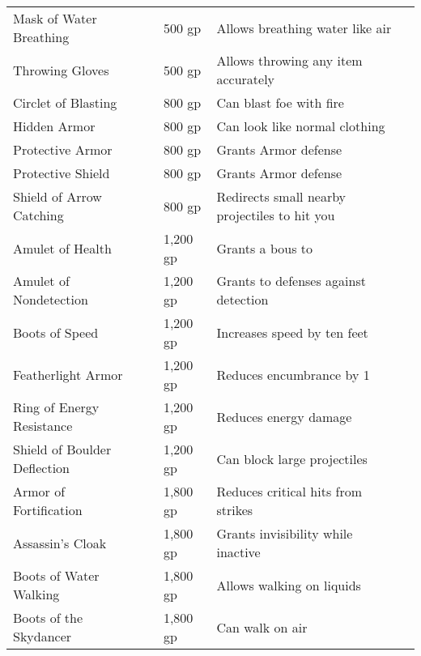 \begin{longtabuwrapper}
\begin{longtabu}{l l l X l}
Mask of Water Breathing &  & 500 gp & Allows breathing water like air & \pageref{item:Mask of Water Breathing} \\
Throwing Gloves &  & 500 gp & Allows throwing any item accurately & \pageref{item:Throwing Gloves} \\
Circlet of Blasting &  & 800 gp & Can blast foe with fire & \pageref{item:Circlet of Blasting} \\
Hidden Armor &  & 800 gp & Can look like normal clothing & \pageref{item:Hidden Armor} \\
Protective Armor &  & 800 gp & Grants  Armor defense & \pageref{item:Protective Armor} \\
Protective Shield &  & 800 gp & Grants  Armor defense & \pageref{item:Protective Shield} \\
Shield of Arrow Catching &  & 800 gp & Redirects small nearby projectiles to hit you & \pageref{item:Shield of Arrow Catching} \\
Amulet of Health &  & 1,200 gp & Grants a  bous to  & \pageref{item:Amulet of Health} \\
Amulet of Nondetection &  & 1,200 gp & Grants  to defenses against detection & \pageref{item:Amulet of Nondetection} \\
Boots of Speed &  & 1,200 gp & Increases speed by ten feet & \pageref{item:Boots of Speed} \\
Featherlight Armor &  & 1,200 gp & Reduces encumbrance by 1 & \pageref{item:Featherlight Armor} \\
Ring of Energy Resistance &  & 1,200 gp & Reduces energy damage & \pageref{item:Ring of Energy Resistance} \\
Shield of Boulder Deflection &  & 1,200 gp & Can block large projectiles & \pageref{item:Shield of Boulder Deflection} \\
Armor of Fortification &  & 1,800 gp & Reduces critical hits from strikes & \pageref{item:Armor of Fortification} \\
Assassin's Cloak &  & 1,800 gp & Grants invisibility while inactive & \pageref{item:Assassin's Cloak} \\
Boots of Water Walking &  & 1,800 gp & Allows walking on liquids & \pageref{item:Boots of Water Walking} \\
Boots of the Skydancer &  & 1,800 gp & Can walk on air & \pageref{item:Boots of the Skydancer} \\

\end{longtabu}
\end{longtabuwrapper}
